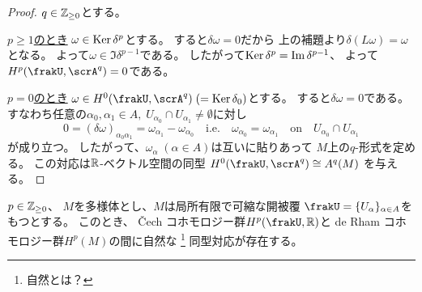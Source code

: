 \documentclass[report]{jlreq}
\begin{document}
\begin{proof}
    $q \in \mathbb{Z}_{\ge 0}$とする。

    \uline{$p \ge 1$のとき} \quad
    $\omega \in \operatorname{\mathrm{Ker}} \delta^p$とする。
    すると$\delta \omega = 0$だから
    上の補題より$\delta(L\omega) = \omega$となる。
    よって$\omega \in \Im \delta^{p - 1}$である。
    したがって$\operatorname{\mathrm{Ker}} \delta^p = \operatorname{\mathrm{Im}} \delta^{p - 1}$、
    よって$H^p(\frakU, \scrA^q) = 0$である。

    \uline{$p = 0$のとき} \quad
    $\omega \in H^0(\frakU, \scrA^q) \; (= \Ker \delta_0)$とする。
    すると$\delta \omega = 0$である。
    すなわち任意の$\alpha_0, \alpha_1 \in A, \;
    U_{\alpha_0} \cap U_{\alpha_1} \ne \emptyset$に対し
    \begin{equation}
        0 = (\delta \omega)_{\alpha_0 \alpha_1}
            = \omega_{\alpha_1} - \omega_{\alpha_0}
            \quad \text{i.e.} \quad
            \omega_{\alpha_0} = \omega_{\alpha_1}
            \quad \text{on} \quad
            U_{\alpha_0} \cap U_{\alpha_1}
    \end{equation}
    が成り立つ。
    したがって、$\omega_\alpha \; (\alpha \in A)$は互いに貼りあって
    $M$上の$q$-形式を定める。
    この対応は$\mathbb{R}$-ベクトル空間の同型
    $H^0(\frakU, \scrA^q) \cong A^q(M)$
    を与える。
\end{proof}

\begin{theorem}
    $p \in \mathbb{Z}_{\ge 0}$、
    $M$を多様体とし、$M$は局所有限で可縮な開被覆
    $\frakU = \{ U_\alpha \}_{\alpha \in A}$をもつとする。
    このとき、
    \v{C}ech コホモロジー群$H^p(\frakU, \R)$と
    de Rham コホモロジー群$H^p(M)$の間に自然な
    \footnote{
        自然とは？
    }
    同型対応が存在する。
\end{theorem}
\end{document}

